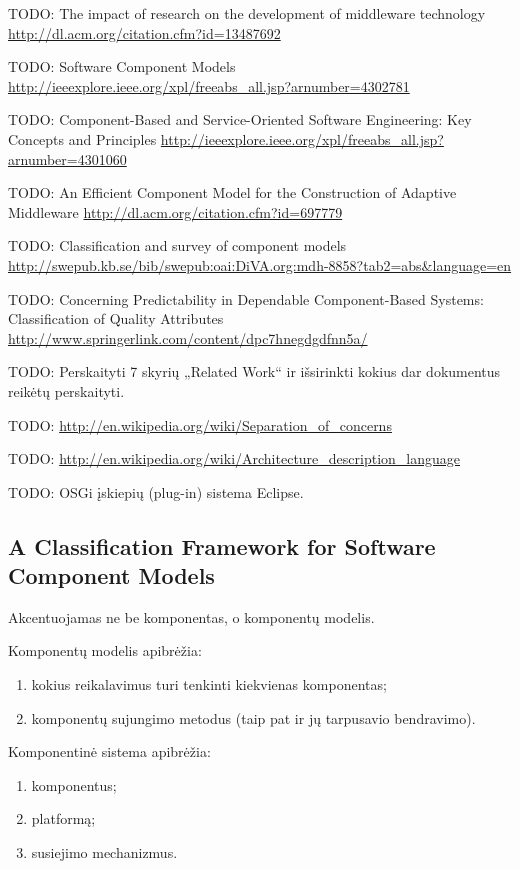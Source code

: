 TODO: The impact of research on the development of middleware technology
\url{http://dl.acm.org/citation.cfm?id=13487692}

TODO: Software Component Models
\url{http://ieeexplore.ieee.org/xpl/freeabs_all.jsp?arnumber=4302781}

TODO: Component-Based and Service-Oriented Software Engineering: Key Concepts and Principles 
\url{http://ieeexplore.ieee.org/xpl/freeabs_all.jsp?arnumber=4301060}

TODO: An Efficient Component Model for the Construction of Adaptive Middleware
\url{http://dl.acm.org/citation.cfm?id=697779}

TODO: Classification and survey of component models
\url{http://swepub.kb.se/bib/swepub:oai:DiVA.org:mdh-8858?tab2=abs&language=en}

TODO: Concerning Predictability in Dependable Component-Based Systems: Classification of Quality Attributes 
\url{http://www.springerlink.com/content/dpc7hnegdgdfnn5a/}

TODO: Perskaityti \cite[18]{classification-framework-for-scm} 7 skyrių
„Related Work“ ir išsirinkti kokius dar dokumentus reikėtų perskaityti.

TODO: \url{http://en.wikipedia.org/wiki/Separation_of_concerns}

TODO: \url{http://en.wikipedia.org/wiki/Architecture_description_language}

TODO: OSGi įskiepių (plug-in) sistema Eclipse.

\subsection{A Classification Framework for Software Component Models}

Akcentuojamas ne be komponentas, o komponentų modelis.

\begin{defn}
  Komponentų modelis apibrėžia:
  \begin{enumerate}
    \item kokius reikalavimus turi tenkinti kiekvienas komponentas;
    \item komponentų sujungimo metodus (taip pat ir jų tarpusavio
      bendravimo).
  \end{enumerate}
  \cite[2]{classification-framework-for-scm}
\end{defn}

\begin{defn}
  Komponentinė sistema apibrėžia:
  \begin{enumerate}
    \item komponentus;
    \item platformą;
    \item susiejimo mechanizmus.
  \end{enumerate}
  \cite[2]{classification-framework-for-scm}
\end{defn}
